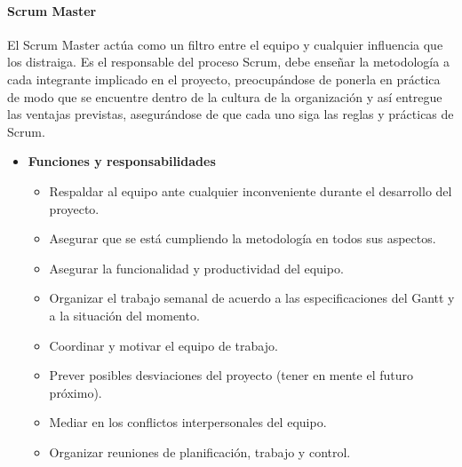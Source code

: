     
        \paragraph{Scrum Master}
        
        El Scrum Master actúa como un filtro entre el equipo y cualquier influencia que los distraiga.
        Es el responsable del proceso Scrum, debe enseñar la metodología a cada integrante implicado en el proyecto, preocupándose de ponerla en práctica de modo que se encuentre dentro de la cultura de la organización y así entregue las ventajas previstas, asegurándose de que cada uno siga las reglas y prácticas de Scrum.
        	\begin{itemize}
			\item \textbf{Funciones y responsabilidades}
            	\begin{itemize}
				\item Respaldar al equipo ante cualquier inconveniente durante el desarrollo del proyecto.
                \item Asegurar que se está cumpliendo la metodología en todos sus aspectos.
                \item Asegurar la funcionalidad y productividad del equipo.
                \item Organizar el trabajo semanal de acuerdo a las especificaciones del Gantt y a la situación del momento.
                \item Coordinar y motivar el equipo de trabajo.
                \item Prever posibles desviaciones del proyecto (tener en mente el futuro próximo).
                \item Mediar en los conflictos interpersonales del equipo.
                \item Organizar reuniones de planificación, trabajo y control.
				\end{itemize}
             

\end{itemize}
